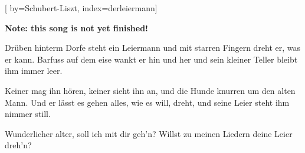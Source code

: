 

[%
    by={Schubert-Liszt},
    index={derleiermann}]


    \label{derleiermann}

    \textbf{Note: this song is not yet finished!}

    \beginverse
        Drüben hinterm Dorfe steht ein Leiermann
        und mit starren Fingern dreht er, was er kann.
        Barfuss auf dem eise wankt er hin und her
        und sein kleiner Teller bleibt ihm immer leer.
    \endverse

    \beginverse
        Keiner mag ihn hören, keiner sieht ihn an,
        und die Hunde knurren um den alten Mann.
        Und er lässt es gehen alles, wie es will,
        dreht, und seine Leier steht ihm nimmer still.
    \endverse

    \beginverse*
        Wunderlicher alter, soll ich mit dir geh'n?
        Willst zu meinen Liedern deine Leier dreh'n?
    \endverse
\endsong
